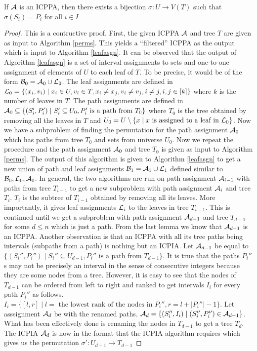 \documentclass{llncs}
\def\cA{{\cal A}}
\def\cB{{\cal B}}
\def\cL{{\cal L}}
\begin{document}
\begin{theorem}
\label{th:perm}
  If $\cA$ is an ICPPA, then there exists a bijection $\sigma : U
\rightarrow V(T)$ such that $\sigma(S_i) = P_i$ for all $i \in I$
\end{theorem}
\begin{proof}
This is a contructive proof. First, the given ICPPA $\cA$ and tree $T$ are given as input to Algorithm
\ref{perms}. This yields a ``filtered'' ICPPA as the output which is
input to Algorithm \ref{leafasgn}.
It can be observed that the output of Algorithm \ref{leafasgn} is a set of interval
assignments to sets and one-to-one assignment of elements of $U$ to
each leaf of $T$. To be precise, it would be of the form $\cB_0 =
\cA_0 \cup \cL_0$. The leaf assignments are defined in $\cL_0
= \{ (x_i,v_i) \mid x_i \in U, v_i \in T, x_i \ne x_j, v_i \ne v_j, i \ne j, i,j \in [k] \}$ where $k$ is the
number of leaves in $T$. The path assignments are defined in $\cA_0
\subseteq \{(S_i',P_i') \mid S_i' \subseteq U_0, P_i' \text{ is a path
  from } T_0\}$ where $T_0$ is the tree obtained by removing all the
leaves in $T$ and $U_0 = U \setminus \{ x \mid x \text{ is assigned to
  a leaf in }\cL_0 \}$. Now we have a subproblem of finding the
permutation for the path assignment $\cA_0$ which has paths from tree
$T_0$ and sets from universe $U_0$. Now we repeat the procedure and the path assignment $\cA_0$ and tree $T_0$
is given as input to Algorithm \ref{perms}. The output of this
algorithm is given to Algorithm \ref{leafasgn} to get a new
union of path and leaf assignments $\cB_1 =
\cA_1 \cup \cL_1$ defined similar to $\cB_0, \cL_0, \cA_0$. In
general, the two algorithms are run on
path assignment $\cA_{i-1}$ with paths from tree $T_{i-1}$ to get a new
subproblem with path assignment $\cA_i$ and tree $T_{i}$. $T_i$ is
the subtree of $T_{i-1}$ obtained by removing all its leaves. More importantly, it gives leaf
assignments $\cL_{i}$ to the leaves in tree $T_{i-1}$. This is
continued until we get a subproblem with path assignment $\cA_{d-1}$ and
tree $T_{d-1}$ for some $d \le n$ which is just a
path. From the last lemma we know that $\cA_{d-1}$ is an
ICPPA. Another observation is that an ICPPA with all its tree paths
being intervals (subpaths from a path) is nothing but an ICPIA\cite{nsnrs09}.
Let $\cA_{d-1}$ be equal to $\{(S_i'',P_i'') \mid S_i'' \subseteq U_{d-1}, P_i'' \text{ is a path
  from } T_{d-1} \}$. It is true that the paths $P_i''$s
may not be precisely an interval in the sense of consecutive integers
because they are some nodes from a tree. However, it is easy to see that
the nodes of $T_{d-1}$ can be ordered from left to right and ranked to get
intervals $I_i$ for every path $P_i''$ as follows. $I_i = \{[l,r]
\mid l = \text{ the lowest rank of the nodes in }P_i'', r = l+|P_i''|-1
\}$. Let asssignment $\cA_d$ be with the renamed paths. $\cA_d = \{ (S_i'', I_i) \mid (S_i'', P_i'') \in \cA_{d-1}
\}$. What has been effectively done is renaming the nodes in $T_{d-1}$
to get a tree $T_d$.
The ICPIA $\cA_d$ is now in the format that the ICPIA algorithm
requires which gives us the permutation $\sigma' : U_{d-1} \rightarrow T_{d-1}$


\end{proof}
\end{document}
